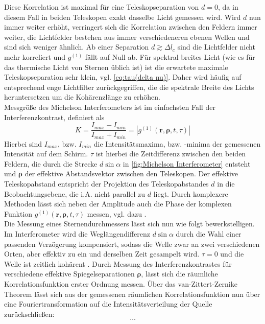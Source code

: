 Diese Korrelation ist maximal für eine Teleskopseparation von $d=0$, da in diesem Fall in beiden Teleskopen exakt dasselbe Licht gemessen wird. 
Wird $d$ nun immer weiter erhöht, verringert sich die Korrelation zwischen den Feldern immer weiter, die Lichtfelder bestehen aus immer verschiedeneren ebenen Wellen und sind sich weniger ähnlich. 
Ab einer Separation $d\gtrsim\Delta l_c$ sind die Lichtfelder nicht mehr korreliert und $g^{(1)}$ fällt auf Null ab. 
Für spektral breites Licht (wie es für das thermische Licht von Sternen üblich ist) ist die erwartete maximale Teleskopseparation sehr klein, vgl. \autoref{eq:tau(delta nu)}. 
Daher wird häufig auf entsprechend enge Lichtfilter zurückgegriffen, die die spektrale Breite des Lichts heruntersetzen um die Kohärenzlänge zu erhöhen. \\


Messgröße des Michelson Interferometers ist im einfachsten Fall der Interferenzkontrast, definiert als \cite{foellmiIntensityInterferometrySecondorder2009}
\begin{equation}
    K = \frac{I_{max}-I_{min}}{I_{max}+I_{min}}=\left|g^{(1)}(\mathbf{r}, \bm{\rho}, t, \tau)\right|
\end{equation} 
Hierbei sind $I_{max}$, bzw. $I_{min}$ die Intensitätsmaxima, bzw. -minima der gemessenen Intensität auf dem Schirm. 
$\tau$ ist hierbei die Zeitdifferenz zwischen den beiden Feldern, die durch die Strecke $d\sin \alpha$ in \autoref{fig:Michelson Interferometer} entsteht und $\bm{\rho}$ der effektive Abstandsvektor zwischen den Teleskopen. 
Der effektive Teleskopabstand entspricht der Projektion des Teleskopabstandes $d$ in die Beobachtungsebene, die i.A. nicht parallel zu $d$ liegt. 
Durch komplexere Methoden lässt sich neben der Amplitude auch die Phase der komplexen Funktion $g^{(1)}(\mathbf{r}, \bm{\rho}, t, \tau)$ messen, vgl. dazu \cite[Kap. 4.3]{mandelOpticalCoherenceQuantum1995}. \\
Die Messung eines Sternendurchmessers lässt sich nun wie folgt bewerkstelligen. 
Im Interferometer wird die Weglängendifferenz $d \sin \alpha$ durch die Wahl einer passenden Verzögerung kompensiert, sodass die Welle zwar an zwei verschiedenen Orten, aber effektiv zu ein und derselben Zeit gesampelt wird. 
$\tau=0$ und die Welle ist zeitlich kohärent \cite{foellmiIntensityInterferometrySecondorder2009}. 
Durch Messung des Interferenzkontrastes für verschiedene effektive Spiegelseparationen $\bm{\rho}$, lässt sich die räumliche Korrelationsfunktion erster Ordnung messen. 
Über das van-Zittert-Zernike Theorem lässt sich aus der gemessenen räumlichen Korrelationsfunktion nun über eine Fouriertransformation auf die Intensitätsverteilung der Quelle zurückschließen:
\begin{equation}
    \dots
\end{equation}

